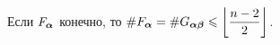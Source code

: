 %
%
%
%
%
%

\begin{corollary}\label{onepoint} 
Если $F_{\bm{\alpha}}$ конечно, то  $\#F_{\bm{\alpha}}=\#G_{{\bm{\alpha}}{\bm{\beta}}}\leqslant\left\lfloor\dfrac{n-2}{2}\right\rfloor$.
\end{corollary}


